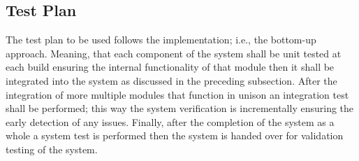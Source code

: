 \subsection{Test Plan}
The test plan to be used follows the implementation; i.e., the bottom-up approach. Meaning, that each component of the system shall be unit tested at each build ensuring the internal functionality of that module then it shall be integrated into the system as discussed in the preceding subsection. After the integration of more multiple modules that function in unison an integration test shall be performed; this way the system verification is incrementally ensuring the early detection of any issues. Finally, after the completion of the system as a whole a system test is performed then the system is handed over for validation testing of the system.
